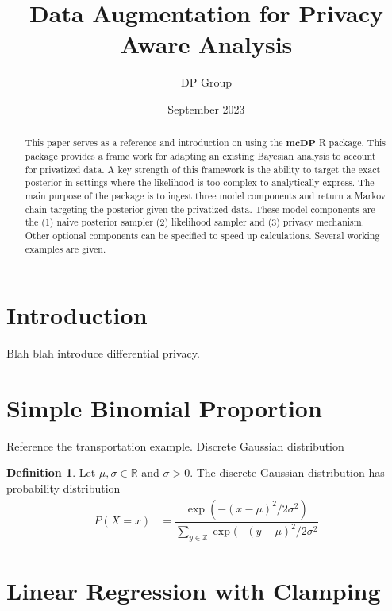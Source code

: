 \documentclass{article}\usepackage[]{graphicx}\usepackage[]{xcolor}
\title{Data Augmentation for Privacy Aware Analysis}
\author{DP Group}
\date{September 2023}
\theoremstyle{definition}
\newtheorem{definition}{Definition}[section]
\newcommand{\dpn}{\textbf{mcDP}}
\begin{document}
\maketitle

\begin{abstract}
    This paper serves as a reference and introduction on using the $\dpn$ R
    package. This package provides a frame work for adapting an existing
    Bayesian analysis to account for privatized data. A key strength of
    this framework is the ability to target the exact posterior in settings
    where the likelihood is too complex to analytically express. The main
    purpose of the package is to ingest three model components and return
    a Markov chain targeting the posterior given the privatized data. These
    model components are the (1) naive posterior sampler (2) likelihood sampler
    and (3) privacy mechanism. Other optional components can be specified to
    speed up calculations. Several working examples are given.
\end{abstract}

\section*{Introduction}

Blah blah introduce differential privacy.

\section*{Simple Binomial Proportion}
Reference the transportation example. Discrete Gaussian distribution

\begin{definition}
Let $\mu, \sigma \in \mathbb{R}$  and $\sigma > 0$. The discrete Gaussian
distribution has probability distribution
\begin{align*}
P(X = x) &= \dfrac{\exp(-(x-\mu)^2/2\sigma^2)}{\sum_{y \in \mathbb{Z}} \exp(-(y-\mu)^2/2\sigma^2}
\end{align*}
\end{definition}

\section*{Linear Regression with Clamping}
\end{document}

